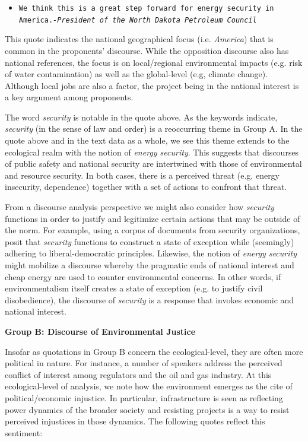 \begin{footnotesize}
\begin{itemize}
\item[] \texttt{We think this is a great step forward for energy security in America.\newline \textit{-President of the North Dakota Petroleum Council}}
\end{itemize}
\end{footnotesize}

This quote indicates the national geographical focus (i.e. \textit{America}) that is common in the proponents' discourse. While the opposition discourse also has national references, the focus is on local/regional environmental impacts (e.g. risk of water contamination) as well as the global-level (e.g, climate change). Although local jobs are also a factor, the project being in the national interest is a key argument among proponents.  

The word \textit{security} is notable in the quote above. As the keywords indicate, \textit{security} (in the sense of law and order) is a reoccurring theme in Group A. In the quote above and in the text data as a whole, we see this theme extends to the ecological realm with the notion of \textit{energy security}. This suggests that discourses of public safety and national security are intertwined with those of environmental and resource security. In both cases, there is a perceived threat (e.g, energy insecurity, dependence) together with a set of actions to confront that threat. 

From a discourse analysis perspective we might also consider how \textit{security} functions in order to justify and legitimize certain actions that may be outside of the norm. For example, using a corpus of documents from security organizations, \cite{MacDonald2019} posit that \textit{security} functions to construct a state of exception while (seemingly) adhering to liberal-democratic principles. Likewise, the notion of \textit{energy security} might mobilize a discourse whereby the pragmatic ends of national interest and cheap energy are used to counter environmental concerns. In other words, if environmentalism itself creates a state of exception (e.g. to justify civil disobedience), the discourse of \textit{security} is a response that invokes economic and national interest.

\textbf{Group B: Discourse of Environmental Justice}

Insofar as quotations in Group B concern the ecological-level, they are often more political in nature. For instance, a number of speakers address the perceived conflict of interest among regulators and the oil and gas industry. At this ecological-level of analysis, we note how the environment emerges as the cite of political/economic injustice. In particular, infrastructure is seen as reflecting power dynamics of the broader society and resisting projects is a way to resist perceived injustices in those dynamics. The following quotes reflect this sentiment:  

